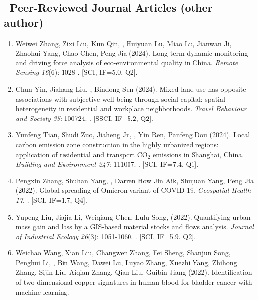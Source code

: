 \subsection*{\texorpdfstring{\faBook\ Peer-Reviewed Journal Articles (other author)}{Other Peer-Reviewed Journal Articles (other author)}}
\begin{enumerate}
\item
    Weiwei Zhang, Zixi Liu, Kun Qin, \Shaoqing, Huiyuan Lu, Miao Lu, Jianwan Ji, Zhaohui Yang, Chao Chen, Peng Jia (2024).
    Long-term dynamic monitoring and driving force analysis of eco-environmental quality in China. 
    \textit{Remote Sensing} \textit{16}(6): 1028
    . [SCI, IF=5.0, Q2].
\item
    Chun Yin, Jiahang Liu, \Shaoqing, Bindong Sun (2024).
    Mixed land use has opposite associations with subjective well-being through social capital: spatial heterogeneity in residential and workplace neighborhoods.
    \textit{Travel Behaviour and Society} \textit{35}: 100724.
    . [SSCI, IF=5.2, Q2].
\item
    Yunfeng Tian, Shudi Zuo, Jiaheng Ju, \Shaoqing, Yin Ren, Panfeng Dou (2024).
    Local carbon emission zone construction in the highly urbanized regions: application of residential and transport CO$_2$ emissions in Shanghai, China.
    \textit{Building and Environment} \textit{247}: 111007.
    . [SCI, IF=7.4, Q1].
\item
    Pengxin Zhang, Shuhan Yang, \Shaoqing, Darren How Jin Aik, Shujuan Yang, Peng Jia (2022).
    Global spreading of Omicron variant of COVID-19.
    \textit{Geospatial Health} \textit{17}.
    . [SCI, IF=1.7, Q4].
\item
    Yupeng Liu, Jiajia Li, Weiqiang Chen, Lulu Song, \Shaoqing \enspace (2022).
    Quantifying urban mass gain and loss by a GIS‐based material stocks and flows analysis.
    \textit{Journal of Industrial Ecology} \textit{26}(3): 1051-1060.
    . [SCI, IF=5.9, Q2].
\item
    Weichao Wang, Xian Liu, Changwen Zhang, Fei Sheng, Shanjun Song, Penghui Li, \Shaoqing, Bin Wang, Dawei Lu, Luyao Zhang, Xuezhi Yang, Zhihong Zhang, Sijin Liu, Aiqian Zhang, Qian Liu, Guibin Jiang (2022).
    Identification of two-dimensional copper signatures in human blood for bladder cancer with machine learning.

\end{enumerate}
